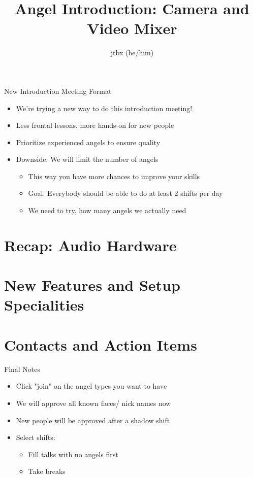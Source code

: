 \documentclass[aspectratio=169]{beamer}
\title{Angel Introduction: Camera and Video Mixer}
\author{jtbx (he/him)}
\institute{C3VOC
	\begin{flushright}
		\texttt{[image: images/qr-code.png]}\\
		https://github.com/voc/engelschulung
	\end{flushright}
}
\begin{document}
\maketitle

\begin{frame}{New Introduction Meeting Format}
	\begin{itemize}
		\item We're trying a new way to do this introduction meeting!
		\item Less frontal lessons, more hands-on for new people
		\item Prioritize experienced angels to ensure quality
		\item Downside: We will limit the number of angels
		\begin{itemize}
			\item This way you have more chances to improve your skills
			\item Goal: Everybody should be able to do at least 2 shifts per day
			\item We need to try, how many angels we actually need
		\end{itemize}
	\end{itemize}
\end{frame}




\section{Recap: Audio Hardware}




\section{New Features and Setup Specialities}

%
%


\section{Contacts and Action Items}

%
%

\begin{frame}{Final Notes}
	\begin{itemize}
		\item Click "join" on the angel types you want to have
		\item We will approve all known faces/ nick names now
		\item New people will be approved after a shadow shift
		\item Select shifts:
		\begin{itemize}
			\item Fill talks with no angels first
			\item Take breaks
		\end{itemize}
	\end{itemize}
\end{frame}
\end{document}

